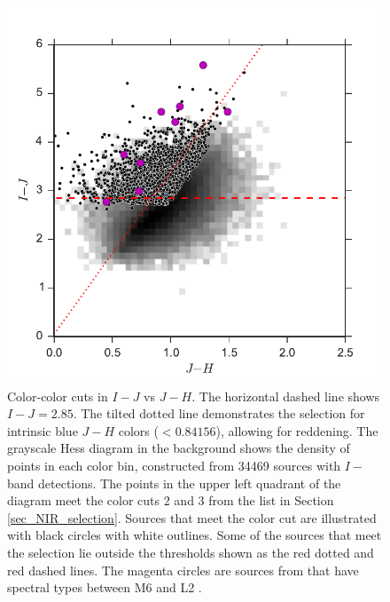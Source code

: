 \begin{figure}[ht!]
  \caption[Photometric selection color-color cuts in $I-J$ vs $J-H$]{Color-color cuts in $I-J$ vs $J-H$. The horizontal dashed line shows $I-J=2.85$.  The tilted dotted line demonstrates the selection for intrinsic blue $J-H$ colors ($<0.84156$), allowing for reddening.  The grayscale Hess diagram in the background shows the density of points in each color bin, constructed from 34469 sources with $I-$band detections.  The points in the upper left quadrant of the diagram meet the color cuts 2 and 3 from the list in Section \ref{sec_NIR_selection}.  Sources that meet the color cut are illustrated with black circles with white outlines.  Some of the sources that meet the selection lie outside the thresholds shown as the red dotted and red dashed lines.  The magenta circles are sources from \citet{allers06} that have spectral types between M6 and L2 \citep{2011ASPC..448..633G}. \label{fig_NIR_selection_JH}}
\centering
\includegraphics[scale=0.6]{chIMACS/figures/NIR_selection_allers_M6_L2}
\end{figure}

